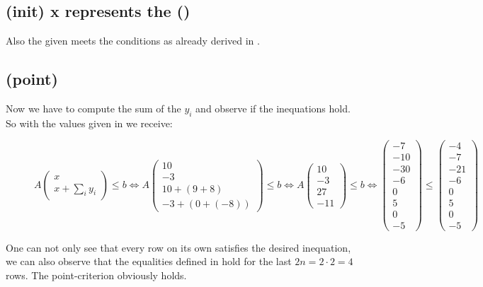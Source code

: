 	\subsection[Verifying: init-criterion]{(init) x represents the \startterm (\stem)}
	Also the given \stem meets the conditions as already derived in .
	
	\newsavebox{\pointcrit}%
	\subsection[Verifying: point-criterion]{(point) \usebox{\pointcrit} }
	
	Now we have to compute the sum of the $y_i$ and observe if the inequations hold. So with the values given in  we receive:
	\begin{figure}[H]
		\centering
		$A\begin{pmatrix} x \\ x + \sum_i y_i \end{pmatrix} \le b \Leftrightarrow A\begin{pmatrix} 10 \\ -3 \\ 10 + (9+8) \\ -3 + (0+(-8))\end{pmatrix} \le b \Leftrightarrow A\begin{pmatrix} 10 \\ -3 \\ 27 \\ -11 \end{pmatrix} \le b \Leftrightarrow \begin{pmatrix} -7 \\ -10 \\ -30 \\ -6 \\ 0 \\ 5 \\ 0 \\ -5 \end{pmatrix} \le \begin{pmatrix}	-4 \\ -7 \\ -21 \\ -6 \\ 0 \\ 5 \\ 0 \\ -5 \end{pmatrix}$ 
	\end{figure}
	One can not only see that every row on its own satisfies the desired inequation, we can also observe that the equalities defined in  hold for the last $2n=2\cdot 2=4$ rows. The point-criterion obviously holds.

